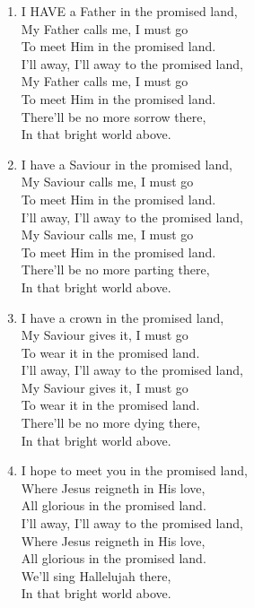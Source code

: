 \begin{enumerate}
    \item I HAVE a Father in the promised land, \\
        My Father calls me, I must go \\
        To meet Him in the promised land. \\
        I'll away, I'll away to the promised land, \\
        My Father calls me, I must go \\
        To meet Him in the promised land. \\
        There'll be no more sorrow there, \\
        In that bright world above.

    \item I have a Saviour in the promised land, \\
        My Saviour calls me, I must go \\
        To meet Him in the promised land. \\
        I'll away, I'll away to the promised land, \\
        My Saviour calls me, I must go \\
        To meet Him in the promised land. \\
        There'll be no more parting there, \\
        In that bright world above.

    \item I have a crown in the promised land, \\
        My Saviour gives it, I must go \\
        To wear it in the promised land. \\
        I'll away, I'll away to the promised land, \\
        My Saviour gives it, I must go \\
        To wear it in the promised land. \\
        There'll be no more dying there, \\
        In that bright world above.

    \item I hope to meet you in the promised land, \\
        Where Jesus reigneth in His love, \\
        All glorious in the promised land. \\
        I'll away, I'll away to the promised land, \\
        Where Jesus reigneth in His love, \\
        All glorious in the promised land. \\
        We'll sing Hallelujah there, \\
        In that bright world above.

\end{enumerate}

